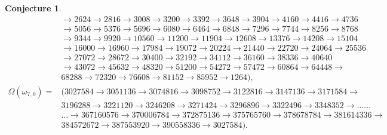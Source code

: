 \documentclass[11pt,a4paper]{article}
\newtheorem{conjecture}{Conjecture}[section]
\begin{document}
\begin{conjecture}
$$\begin{array}{ll}
	&\rightarrow2624\rightarrow2816\rightarrow3008\rightarrow3200\rightarrow3392\rightarrow3648\rightarrow3904\rightarrow4160\rightarrow4416\rightarrow4736\\&\rightarrow5056\rightarrow5376\rightarrow5696\rightarrow6080\rightarrow6464\rightarrow6848\rightarrow7296\rightarrow7744\rightarrow8256\rightarrow8768\\&\rightarrow9344\rightarrow9920\rightarrow10560\rightarrow11200\rightarrow11904\rightarrow12608\rightarrow13376\rightarrow14208\rightarrow15104\\&\rightarrow16000\rightarrow16960\rightarrow17984\rightarrow19072\rightarrow20224\rightarrow21440\rightarrow22720\rightarrow24064\rightarrow25536\\&\rightarrow27072\rightarrow28672\rightarrow30400\rightarrow32192\rightarrow34112\rightarrow36160\rightarrow38336\rightarrow40640\\&\rightarrow43072\rightarrow45632\rightarrow48320\rightarrow51200\rightarrow54272\rightarrow57472\rightarrow60864\rightarrow64448\rightarrow\\&68288\rightarrow72320\rightarrow76608\rightarrow81152\rightarrow85952\rightarrow1264\bigr),\\
	\Omega(\omega_{7,0})=&\bigl(
	3027584\rightarrow3051136\rightarrow3074816\rightarrow3098752\rightarrow 3122816\rightarrow3147136\rightarrow3171584\rightarrow\\&3196288\rightarrow3221120\rightarrow3246208\rightarrow3271424\rightarrow3296896\rightarrow3322496\rightarrow3348352\rightarrow\ldots\ldots\\&
	\ldots\rightarrow
	367160576\rightarrow370006784\rightarrow372875136\rightarrow375765760\rightarrow378678784\rightarrow381614336\rightarrow\\& 384572672\rightarrow387553920\rightarrow390558336\rightarrow3027584\bigr).
\end{array}$$		
\end{conjecture}
\end{document}
